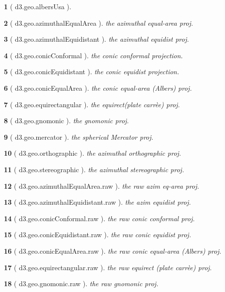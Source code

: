 \documentclass[10pt,landscape,letterpaper]{article}
\newcounter{thm}
\theoremstyle{mytheoremstyle}
\newtheorem*{thm}{}
\begin{document}
\begin{multicols}{3}
\begin{thm} [ d3.geo.albersUsa ]
\end{thm}\begin{thm} [ d3.geo.azimuthalEqualArea ]  the azimuthal equal-area proj.
\end{thm}\begin{thm} [ d3.geo.azimuthalEquidistant ]  the azimuthal equidist proj.
\end{thm}\begin{thm} [ d3.geo.conicConformal ]  the conic conformal projection.
\end{thm}\begin{thm} [ d3.geo.conicEquidistant ]  the conic equidist projection.
\end{thm}\begin{thm} [ d3.geo.conicEqualArea ]  the conic equal-area (Albers) proj.
\end{thm}\begin{thm} [ d3.geo.equirectangular ]  the equirect(plate carr\`ee) proj.
\end{thm}\begin{thm} [ d3.geo.gnomonic ]  the gnomonic proj.
\end{thm}\begin{thm} [ d3.geo.mercator ]  the spherical Mercator proj.
\end{thm}\begin{thm} [ d3.geo.orthographic ]  the azimuthal orthographic proj.
\end{thm}\begin{thm} [ d3.geo.stereographic ]  the azimuthal stereographic proj.
\end{thm}\begin{thm} [ d3.geo.azimuthalEqualArea.raw ]  the raw azim eq-area proj.
\end{thm}\begin{thm} [ d3.geo.azimuthalEquidistant.raw ]  the azim equidist proj.
\end{thm}\begin{thm} [ d3.geo.conicConformal.raw ]  the raw conic conformal proj.
\end{thm}\begin{thm} [ d3.geo.conicEquidistant.raw ]  the raw conic equidist proj.
\end{thm}\begin{thm} [ d3.geo.conicEqualArea.raw ]  the raw conic equal-area (Albers) proj.
\end{thm}\begin{thm} [ d3.geo.equirectangular.raw ]  the raw equirect (plate carr\`ee) proj.
\end{thm}\begin{thm} [ d3.geo.gnomonic.raw ]  the raw gnomonic proj.

\end{thm}
\end{multicols}
\end{document}
